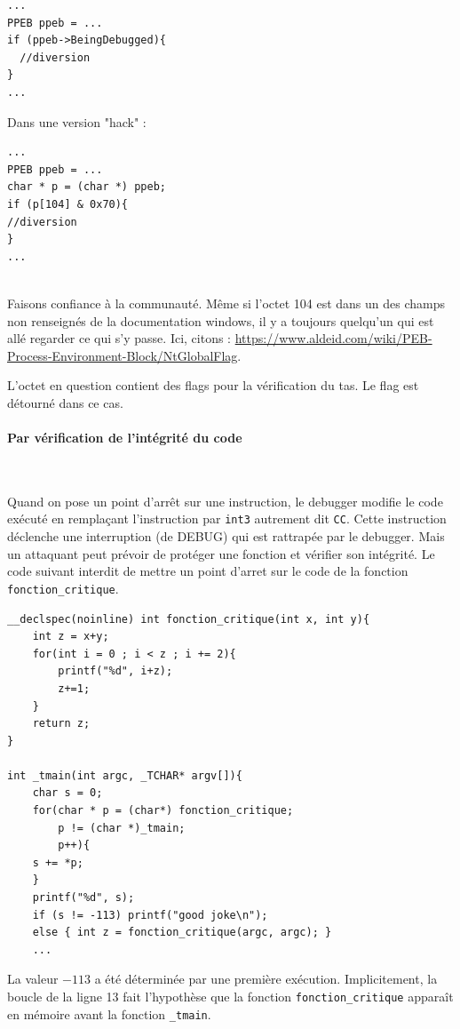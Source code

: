 \documentclass{book}
\newenvironment{commentaire}[1]{%
	\def\FrameCommand{\fboxrule=\FrameRule\fboxsep=\FrameSep \fcolorbox{yellow!50}{yellow!10}}%
	\MakeFramed {\advance\hsize-\width \FrameRestore}
	\noindent {\bf #1}\\
}%
{\endMakeFramed}
\newcommand{\code}[1]{\texttt{#1}}
\newcommand{\Windows}{{\sc windows}}
\begin{document}
\begin{verbatim}
...
PPEB ppeb = ...
if (ppeb->BeingDebugged){
  //diversion
}
...
\end{verbatim}

Dans une version "hack" : 

\begin{verbatim}
...
PPEB ppeb = ...
char * p = (char *) ppeb;
if (p[104] & 0x70){
//diversion
}
...
\end{verbatim}

\begin{commentaire}{Mais d'où cela vient il ?}
Faisons confiance à la communauté. Même si l'octet 104 est dans un des champs non renseignés de la documentation \Windows, il y a toujours quelqu'un qui est allé regarder ce qui s'y passe. Ici, citons : \url{https://www.aldeid.com/wiki/PEB-Process-Environment-Block/NtGlobalFlag}.

L'octet en question contient des flags pour la vérification du tas. Le flag est détourné dans ce cas.   
\end{commentaire}

\paragraph{Par vérification de l'intégrité du code}~

\medskip
Quand on pose un point d'arrêt sur une instruction, le debugger modifie le code exécuté en remplaçant l'instruction par 
\texttt{int3}
autrement dit \code{CC}. Cette instruction déclenche une interruption (de DEBUG) qui est rattrapée par le debugger. Mais un attaquant peut prévoir de protéger une fonction et vérifier son intégrité. Le code suivant interdit de mettre un point d'arret sur le code de la fonction \code{fonction\_critique}.

\begin{verbatim}
__declspec(noinline) int fonction_critique(int x, int y){
	int z = x+y;
	for(int i = 0 ; i < z ; i += 2){
		printf("%d", i+z);
		z+=1;
	}
	return z;
}

int _tmain(int argc, _TCHAR* argv[]){	
	char s = 0;
	for(char * p = (char*) fonction_critique; 
		p != (char *)_tmain; 
		p++){ 
	s += *p;
	}
	printf("%d", s);
	if (s != -113) printf("good joke\n");
	else { int z = fonction_critique(argc, argc); }
	...
\end{verbatim}

La valeur $-113$ a été déterminée par une première exécution. Implicitement, la boucle de la ligne 13 fait l'hypothèse que la fonction \code{fonction\_critique} apparaît en mémoire avant la fonction \code{\_tmain}. 
\end{document}
